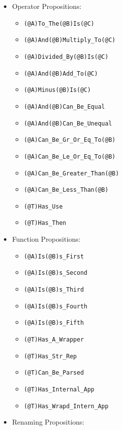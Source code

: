 \documentclass{article}
\begin{document}
\begin{itemize}

\item Operator Propositions:

  \begin{itemize}
  \item \verb|(@A)To_The(@B)Is(@C)|
  \item \verb|(@A)And(@B)Multiply_To(@C)|
  \item \verb|(@A)Divided_By(@B)Is(@C)|
  \item \verb|(@A)And(@B)Add_To(@C)|
  \item \verb|(@A)Minus(@B)Is(@C)|
  \item \verb|(@A)And(@B)Can_Be_Equal|
  \item \verb|(@A)And(@B)Can_Be_Unequal|
  \item \verb|(@A)Can_Be_Gr_Or_Eq_To(@B)|
  \item \verb|(@A)Can_Be_Le_Or_Eq_To(@B)|
  \item \verb|(@A)Can_Be_Greater_Than(@B)|
  \item \verb|(@A)Can_Be_Less_Than(@B)|
  \item \verb|(@T)Has_Use|
  \item \verb|(@T)Has_Then|
  \end{itemize}

\item Function Propositions:

  \begin{itemize}
  \item \verb|(@A)Is(@B)s_First|
  \item \verb|(@A)Is(@B)s_Second|
  \item \verb|(@A)Is(@B)s_Third|
  \item \verb|(@A)Is(@B)s_Fourth|
  \item \verb|(@A)Is(@B)s_Fifth|
  \item \verb|(@T)Has_A_Wrapper|
  \item \verb|(@T)Has_Str_Rep|
  \item \verb|(@T)Can_Be_Parsed|
  \item \verb|(@T)Has_Internal_App|
  \item \verb|(@T)Has_Wrapd_Intern_App|
  \end{itemize}

\item Renaming Propositions:


\end{itemize}
\end{document}
